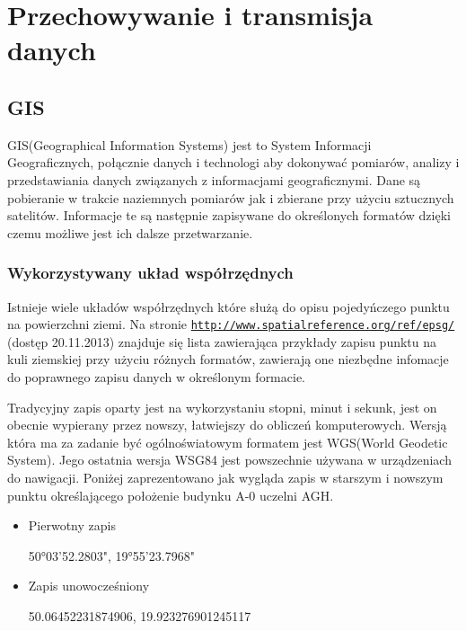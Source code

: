 \clearpage
\newpage
\section{Przechowywanie i transmisja danych}
\label{sec:przesyl}

\subsection{GIS}
\label{subsec:gis}

GIS(Geographical Information Systems) jest to System Informacji Geograficznych, połącznie danych i technologi aby dokonywać pomiarów, analizy i przedstawiania danych związanych z informacjami geograficznymi. Dane są pobieranie w trakcie naziemnych pomiarów jak i zbierane przy użyciu sztucznych satelitów. Informacje te są następnie zapisywane do określonych formatów dzięki czemu możliwe jest ich dalsze przetwarzanie.

\subsubsection{Wykorzystywany układ współrzędnych}
\label{subsec:uklad}

Istnieje wiele układów współrzędnych które służą do opisu pojedyńczego punktu na powierzchni ziemi. Na stronie \underline{\texttt{http://www.spatialreference.org/ref/epsg/}} (dostęp 20.11.2013) znajduje się lista zawierająca przykłady zapisu punktu na kuli ziemskiej przy użyciu różnych formatów, zawierają one niezbędne infomacje do poprawnego zapisu danych w określonym formacie.

Tradycyjny zapis oparty jest na wykorzystaniu stopni, minut i sekunk, jest on obecnie wypierany przez nowszy, łatwiejszy do obliczeń komputerowych. Wersją która ma za zadanie być ogólnoświatowym formatem jest WGS(World Geodetic System). Jego ostatnia wersja  WSG84 jest powszechnie używana w urządzeniach do nawigacji. Poniżej zaprezentowano jak wygląda zapis w starszym i nowszym punktu określającego położenie budynku A-0 uczelni AGH.

\begin{itemize}

\item
Pierwotny zapis

50°03'52.2803", 19°55'23.7968"
\item
Zapis unowocześniony

50.06452231874906, 19.923276901245117
\end{itemize}

